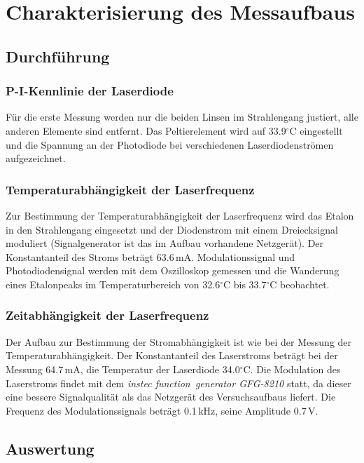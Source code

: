 \section{Charakterisierung des Messaufbaus}
\subsection{Durchführung}
\label{sect:durchführung}
\subsubsection*{P-I-Kennlinie der Laserdiode}
Für die erste Messung werden nur die beiden Linsen im Strahlengang justiert, alle anderen Elemente sind entfernt.
Das Peltierelement wird auf 33.9$^\circ$C eingestellt und die Spannung an der
Photodiode bei verschiedenen Laserdiodenströmen aufgezeichnet.

\subsubsection*{Temperaturabhängigkeit der Laserfrequenz}
Zur Bestimmung der Temperaturabhängigkeit der
Laserfrequenz wird das Etalon in den Strahlengang eingesetzt und der Diodenstrom mit einem Dreiecksignal moduliert
(Signalgenerator ist das im Aufbau vorhandene Netzgerät).
Der Konstantanteil des Stroms beträgt 63.6\,mA.
Modulationssignal und Photodiodensignal werden mit dem Oszilloskop gemessen und die Wanderung eines Etalonpeaks
im Temperaturbereich von 32.6$^\circ$C bis 33.7$^\circ$C beobachtet.

\subsubsection*{Zeitabhängigkeit der Laserfrequenz}
Der Aufbau zur Bestimmung der Stromabhängigkeit ist
wie bei der Messung der Temperaturabhängigkeit.
Der Konstantanteil des Laserstroms beträgt bei der Messung 64.7\,mA,
die Temperatur der Laserdiode 34.0$^\circ$C.
Die Modulation des Laserstroms findet mit dem \emph{instec function~generator GFG-8210} statt,
da dieser eine bessere Signalqualität als das Netzgerät des Versuchsaufbaus liefert.
Die Frequenz des Modulationssignals beträgt 0.1\,kHz, seine Amplitude 0.7\,V.

\subsection{Auswertung}
